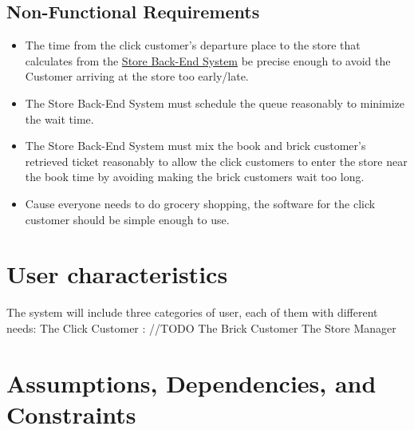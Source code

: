 \documentclass[a4paper,12pt]{report}
\begin{document}
\subsection{Non-Functional Requirements}
\begin{itemize}
	\item The time from the click customer's departure place to the store that calculates from the \hyperref[Definitions]{Store Back-End System} be precise enough to avoid the Customer arriving at the store too early/late.
	\item The Store Back-End System must schedule the queue reasonably to minimize the wait time.
	\item The Store Back-End System must mix the book and brick customer's retrieved ticket reasonably to allow the click customers to enter the store near the book time by avoiding making the brick customers wait too long.
	\item Cause everyone needs to do grocery shopping, the software for the click customer should be simple enough to use.
\end{itemize}


\section{User characteristics}
The system will include three categories of user, each of them with different needs:
The Click Customer : //TODO
The Brick Customer
The Store Manager


\section{Assumptions, Dependencies, and Constraints}
\end{document}
